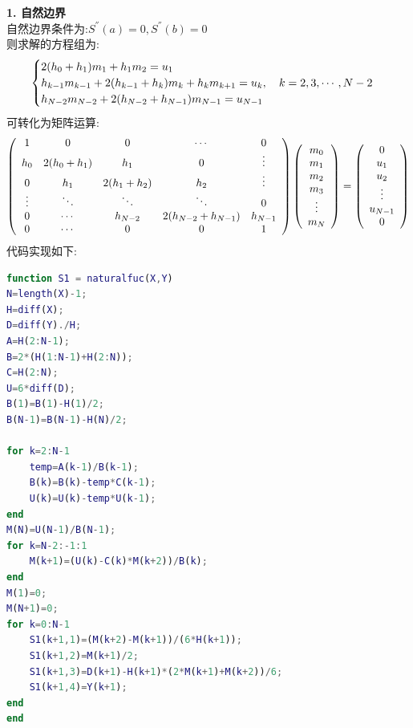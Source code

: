 \documentclass[UTF8]{ctexart}
\begin{document}
\textbf{1. 自然边界}\\
自然边界条件为:$S^{''}(a)=0,S^{''}(b)=0$\\
则求解的方程组为:
\begin{equation}
	\begin{cases}
		2(h_0+h_1)m_1+h_1m_2=u_1 \\
		h_{k-1}m_{k-1}+2(h_{k-1}+h_k)m_k+h_km_{k+1}=u_k,\quad k=2,3,\cdots ,N-2 \\
		h_{N-2}m_{N-2}+2(h_{N-2}+h_{N-1})m_{N-1}=u_{N-1} \notag
	\end{cases}
\end{equation}
可转化为矩阵运算:
\begin{equation}
	\left(
	\begin{array}{ccccc}
		1 & 0 & 0 & \cdots & 0 \\
		h_0 & 2(h_0+h_1) & h_1 & 0 & \vdots\\
		0 & h_1 & 2(h_1+h_2) & h_2 & \vdots\\
		\vdots & \ddots & \ddots & \ddots & 0\\
		0 & \cdots & h_{N-2} & 2(h_{N-2}+h_{N-1}) & h_{N-1}\\
		0 & \cdots & 0 & 0 & 1 
	\end{array}
	\right)
	\left(
	\begin{array}{c}
		m_0\\
		m_1\\
		m_2\\
		m_3\\
		\vdots \\
		m_N
	\end{array}
	\right)
	=
	\left(
	\begin{array}{c}
		0\\
		u_1\\
		u_2\\
		\vdots \\
		u_{N-1}\\
		0
	\end{array}
	\right) \notag
\end{equation}
代码实现如下:
\begin{lstlisting}[language=matlab]
function S1 = naturalfuc(X,Y)
N=length(X)-1;
H=diff(X);
D=diff(Y)./H;
A=H(2:N-1);
B=2*(H(1:N-1)+H(2:N));
C=H(2:N);
U=6*diff(D);
B(1)=B(1)-H(1)/2;
B(N-1)=B(N-1)-H(N)/2;

for k=2:N-1
	temp=A(k-1)/B(k-1);
	B(k)=B(k)-temp*C(k-1);
	U(k)=U(k)-temp*U(k-1);
end
M(N)=U(N-1)/B(N-1);
for k=N-2:-1:1
	M(k+1)=(U(k)-C(k)*M(k+2))/B(k);
end
M(1)=0;
M(N+1)=0;
for k=0:N-1
	S1(k+1,1)=(M(k+2)-M(k+1))/(6*H(k+1));
	S1(k+1,2)=M(k+1)/2;
	S1(k+1,3)=D(k+1)-H(k+1)*(2*M(k+1)+M(k+2))/6;
	S1(k+1,4)=Y(k+1);
end
end
\end{lstlisting}
\end{document}

